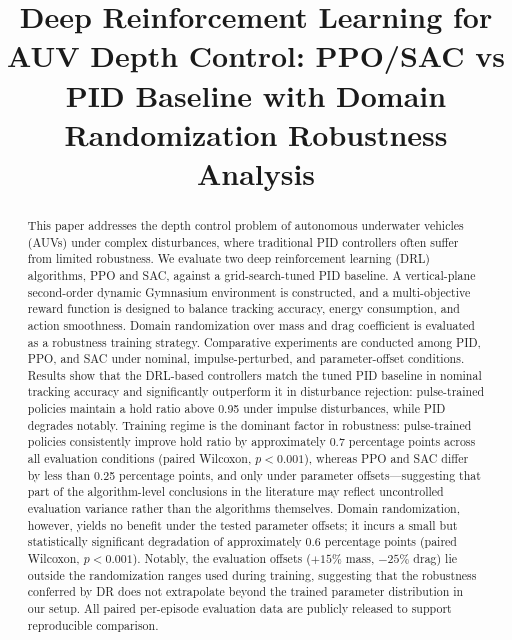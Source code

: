 \documentclass[conference]{IEEEtran}
\begin{document}
\title{Deep Reinforcement Learning for AUV Depth Control: PPO/SAC vs PID Baseline with Domain Randomization Robustness Analysis}

\author{
\and
{}
}

\maketitle

\begin{abstract}
This paper addresses the depth control problem of autonomous underwater vehicles (AUVs) under complex disturbances, where traditional PID controllers often suffer from limited robustness. We evaluate two deep reinforcement learning (DRL) algorithms, PPO and SAC, against a grid-search-tuned PID baseline. A vertical-plane second-order dynamic Gymnasium environment is constructed, and a multi-objective reward function is designed to balance tracking accuracy, energy consumption, and action smoothness. Domain randomization over mass and drag coefficient is evaluated as a robustness training strategy. Comparative experiments are conducted among PID, PPO, and SAC under nominal, impulse-perturbed, and parameter-offset conditions. Results show that the DRL-based controllers match the tuned PID baseline in nominal tracking accuracy and significantly outperform it in disturbance rejection: pulse-trained policies maintain a hold ratio above 0.95 under impulse disturbances, while PID degrades notably. Training regime is the dominant factor in robustness: pulse-trained policies consistently improve hold ratio by approximately 0.7 percentage points across all evaluation conditions (paired Wilcoxon, $p < 0.001$), whereas PPO and SAC differ by less than 0.25 percentage points, and only under parameter offsets---suggesting that part of the algorithm-level conclusions in the literature may reflect uncontrolled evaluation variance rather than the algorithms themselves. Domain randomization, however, yields no benefit under the tested parameter offsets; it incurs a small but statistically significant degradation of approximately 0.6 percentage points (paired Wilcoxon, $p < 0.001$). Notably, the evaluation offsets ($+15\%$ mass, $-25\%$ drag) lie outside the randomization ranges used during training, suggesting that the robustness conferred by DR does not extrapolate beyond the trained parameter distribution in our setup. All paired per-episode evaluation data are publicly released to support reproducible comparison.
\end{abstract}
\end{document}
